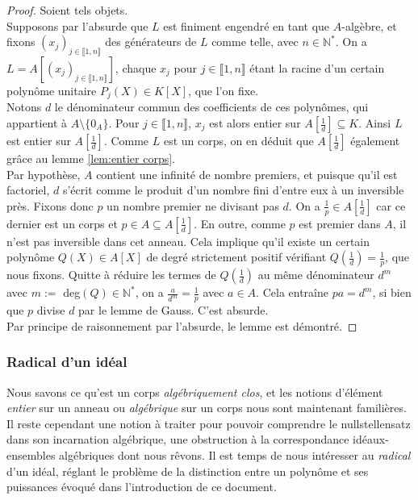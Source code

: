 \documentclass[10pt, twoside]{article}
\theoremstyle{plain}
\theoremstyle{definition}
\theoremstyle{plain}
\theoremstyle{plain}
\theoremstyle{definition}
\theoremstyle{remark}
\begin{document}
\begin{proof}
    Soient tels objets.\\
    Supposons par l'absurde que $L$ est finiment engendré en tant que $A$-algèbre, et fixons $(x_j)_{j \in \llbracket 1, n \rrbracket}$ des générateurs de $L$ comme telle, avec $n \in \mathbb{N}^*$. On a $L = A[(x_j)_{j \in \llbracket 1, n \rrbracket}]$, chaque $x_j$ pour $j \in \llbracket 1, n \rrbracket$ étant la racine d'un certain polynôme unitaire $P_j(X) \in K[X]$, que l'on fixe.\\
    Notons $d$ le dénominateur commun des coefficients de ces polynômes, qui appartient à $A \setminus \{ 0_A\}$. Pour $j \in \llbracket 1, n \rrbracket$, $x_j$ est alors entier sur $A[\frac{1}{d}] \subseteq K$. Ainsi $L$ est entier sur $A[\frac{1}{d}]$. Comme $L$ est un corps, on en déduit que $A[\frac{1}{d}]$ également grâce au lemme \ref{lem:entier corps}.\\
    Par hypothèse, $A$ contient une infinité de nombre premiers, et puisque qu'il est factoriel, $d$ s'écrit comme le produit d'un nombre fini d'entre eux à un inversible près. Fixons donc $p$ un nombre premier ne divisant pas $d$. On a $\frac{1}{p} \in A[\frac{1}{d}]$ car ce dernier est un corps et $p \in A \subseteq A[\frac{1}{d}]$. En outre, comme $p$ est premier dans $A$, il n'est pas inversible dans cet anneau. Cela implique qu'il existe un certain polynôme $Q(X) \in A[X]$ de degré strictement positif vérifiant $Q(\frac{1}{d}) = \frac{1}{p}$, que nous fixons. Quitte à réduire les termes de $Q(\frac{1}{d})$ au même dénominateur $d^m$ avec $m :=$ deg$(Q) \in \mathbb{N}^*$, on a $\frac{a}{d^m} = \frac{1}{p}$ avec $a \in A$. Cela entraîne $pa = d^m$, si bien que $p$ divise $d$ par le lemme de Gauss. C'est absurde.\\
    Par principe de raisonnement par l'absurde, le lemme est démontré.
\end{proof}

\subsubsection{Radical d'un idéal}

Nous savons ce qu'est un corps \textit{algébriquement clos}, et les notions d'élément \textit{entier} sur un anneau ou \textit{algébrique} sur un corps nous sont maintenant familières. Il reste cependant une notion à traiter pour pouvoir comprendre le nullstellensatz dans son incarnation algébrique, une obstruction à la correspondance idéaux-ensembles algébriques dont nous rêvons. Il est temps de nous intéresser au \textit{radical} d'un idéal, réglant le problème de la distinction entre un polynôme et ses puissances évoqué dans l'introduction de ce document.
\end{document}
